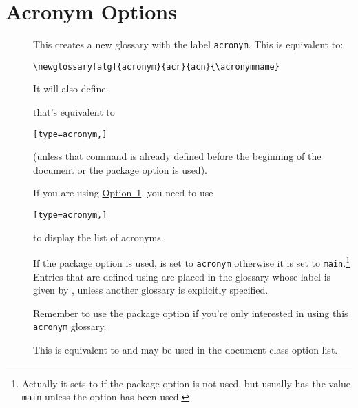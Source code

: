 \documentclass[report,inlinetitle]{nlctdoc}
\newcommand*{\opt}[1]{\hyperlink{option#1}{Option~#1}}
\begin{document}
\section{Acronym Options}
\label{sec:pkgopts-acronym}

\begin{description}
\item[] This creates a new glossary with the
label \texttt{acronym}. This is equivalent to:
\begin{verbatim}
\newglossary[alg]{acronym}{acr}{acn}{\acronymname}
\end{verbatim}
It will also define
\begin{definition}[\DescribeMacro\printacronyms]
\end{definition}
that's equivalent to
\begin{alltt}
[type=acronym,]
\end{alltt}
(unless that command is already defined before the beginning of the
document or the package option  is used).

If you are using \opt1, you need to use
\begin{alltt}
[type=acronym,]
\end{alltt}
to display the list of acronyms.

If the  package option is used, 
is set to \texttt{acronym} otherwise it is set to 
\texttt{main}.\footnote{Actually it sets  to
 if the  package option is
not used, but  usually has the value
\texttt{main} unless the  option has been used.} 
Entries that are defined using  are placed in
the glossary whose label is given by , unless
another glossary is explicitly specified.

\begin{important}
Remember to use the  package option if you're only
interested in using this \texttt{acronym} glossary.
\end{important}

\item[] This is equivalent to
 and may be used in the document class option
list.


\end{description}
\end{document}

